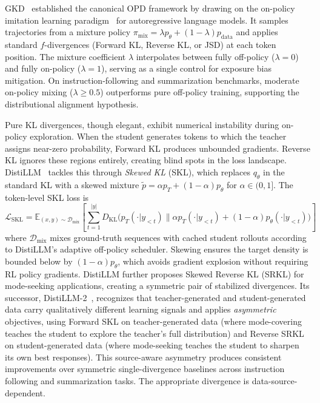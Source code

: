 \documentclass{article} %
\newcommand{\E}{\mathbb{E}}
\newcommand{\KL}{D_{\mathrm{KL}}}
\newcommand{\ptheta}{p_\theta}
\newcommand{\pteacher}{p_T}
\newcommand{\pdata}{p_{\mathrm{data}}}
\newcommand{\loss}{\mathcal{L}}
\begin{document}
GKD~\citep{2306.13649} established the canonical OPD framework by drawing on the on-policy imitation learning paradigm~\citep{1011.0686} for autoregressive language models. It samples trajectories from a mixture policy $\pi_{\mathrm{mix}} = \lambda \ptheta + (1-\lambda) \pdata$ and applies standard $f$-divergences (Forward KL, Reverse KL, or JSD) at each token position. The mixture coefficient $\lambda$ interpolates between fully off-policy ($\lambda=0$) and fully on-policy ($\lambda=1$), serving as a single control for exposure bias mitigation. On instruction-following and summarization benchmarks, moderate on-policy mixing ($\lambda \geq 0.5$) outperforms pure off-policy training, supporting the distributional alignment hypothesis.

Pure KL divergences, though elegant, exhibit numerical instability during on-policy exploration. When the student generates tokens to which the teacher assigns near-zero probability, Forward KL produces unbounded gradients. Reverse KL ignores these regions entirely, creating blind spots in the loss landscape. DistiLLM~\citep{2402.03898} tackles this through \emph{Skewed KL} (SKL), which replaces $q_\theta$ in the standard KL with a skewed mixture $\tilde{p} = \alpha \pteacher + (1-\alpha)\ptheta$ for $\alpha \in (0,1]$. The token-level SKL loss is
\begin{equation*}
    \loss_{\text{SKL}} = \E_{(x,y) \sim \mathcal{D}_{\text{mix}}} \left[ \sum_{t=1}^{|y|} \KL\big(\pteacher(\cdot|y_{<t}) \parallel \alpha \pteacher(\cdot|y_{<t}) + (1-\alpha) \ptheta(\cdot|y_{<t})\big) \right]
\end{equation*}
where $\mathcal{D}_{\text{mix}}$ mixes ground-truth sequences with cached student rollouts according to DistiLLM's adaptive off-policy scheduler.
Skewing ensures the target density is bounded below by $(1-\alpha)\ptheta$, which avoids gradient explosion without requiring RL policy gradients. DistiLLM further proposes Skewed Reverse KL (SRKL) for mode-seeking applications, creating a symmetric pair of stabilized divergences. Its successor, DistiLLM-2~\citep{2503.07067}, recognizes that teacher-generated and student-generated data carry qualitatively different learning signals and applies \emph{asymmetric} objectives, using Forward SKL on teacher-generated data (where mode-covering teaches the student to explore the teacher's full distribution) and Reverse SRKL on student-generated data (where mode-seeking teaches the student to sharpen its own best responses). This source-aware asymmetry produces consistent improvements over symmetric single-divergence baselines across instruction following and summarization tasks. The appropriate divergence is data-source-dependent.
\end{document}
